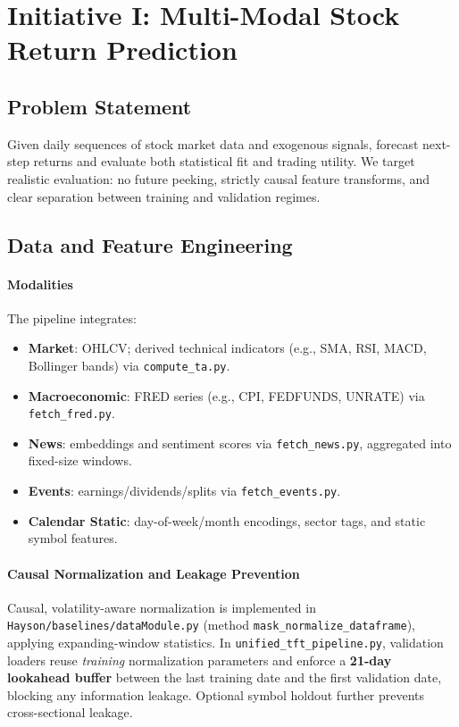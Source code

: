 \documentclass[11pt]{article}
\begin{document}
\section{Initiative I: Multi-Modal Stock Return Prediction}
\subsection{Problem Statement}
Given daily sequences of stock market data and exogenous signals, forecast next-step returns and evaluate both statistical fit and trading utility. We target realistic evaluation: no future peeking, strictly causal feature transforms, and clear separation between training and validation regimes.

\subsection{Data and Feature Engineering}
\paragraph{Modalities}
The pipeline integrates:
\begin{itemize}[leftmargin=*]
  \item \textbf{Market}: OHLCV; derived technical indicators (e.g., SMA, RSI, MACD, Bollinger bands) via \texttt{compute\_ta.py}.
  \item \textbf{Macroeconomic}: FRED series (e.g., CPI, FEDFUNDS, UNRATE) via \texttt{fetch\_fred.py}.
  \item \textbf{News}: embeddings and sentiment scores via \texttt{fetch\_news.py}, aggregated into fixed-size windows.
  \item \textbf{Events}: earnings/dividends/splits via \texttt{fetch\_events.py}.
  \item \textbf{Calendar \/ Static}: day-of-week/month encodings, sector tags, and static symbol features.
\end{itemize}

\paragraph{Causal Normalization and Leakage Prevention}
Causal, volatility-aware normalization is implemented in \texttt{Hayson/baselines/dataModule.py} (method \texttt{mask\_normalize\_dataframe}), applying expanding-window statistics. In \texttt{unified\_tft\_pipeline.py}, validation loaders reuse \emph{training} normalization parameters and enforce a \textbf{21-day lookahead buffer} between the last training date and the first validation date, blocking any information leakage. Optional symbol holdout further prevents cross-sectional leakage.
\end{document}
